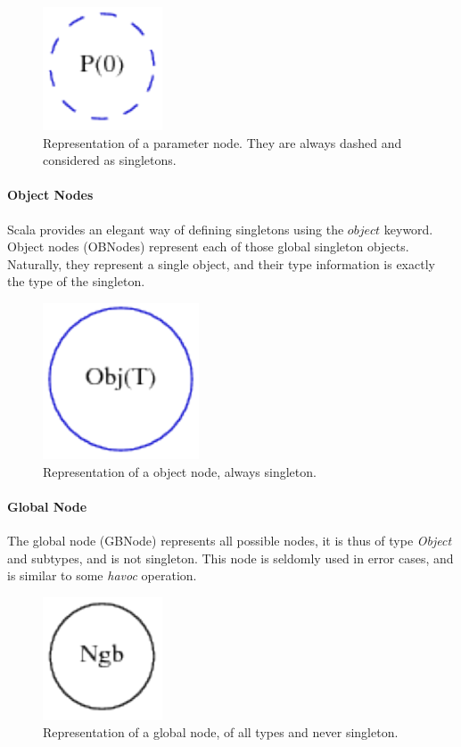\begin{figure}[h]
    \centering

    \includegraphics{images/pt_pnodes}

    \caption{Representation of a parameter node. They are always dashed and
    considered as singletons.}
    \label{fig:pt:pnodes}
\end{figure}

\paragraph{Object Nodes} Scala provides an elegant way of defining singletons
using the $object$ keyword. Object nodes (OBNodes) represent each of those
global singleton objects. Naturally, they represent a single object, and their
type information is exactly the type of the singleton.

\begin{figure}[h]
    \centering

    \includegraphics{images/pt_obnodes}

    \caption{Representation of a object node, always singleton.}
    \label{fig:pt:obnodes}
\end{figure}

\paragraph{Global Node} The global node (GBNode) represents all possible nodes,
it is thus of type \emph{Object} and subtypes, and is not singleton. This node
is seldomly used in error cases, and is similar to some \emph{havoc} operation.

\begin{figure}[h]
    \centering

    \includegraphics{images/pt_gbnodes}

    \caption{Representation of a global node, of all types and never singleton.}
    \label{fig:pt:gbnodes}
\end{figure}

